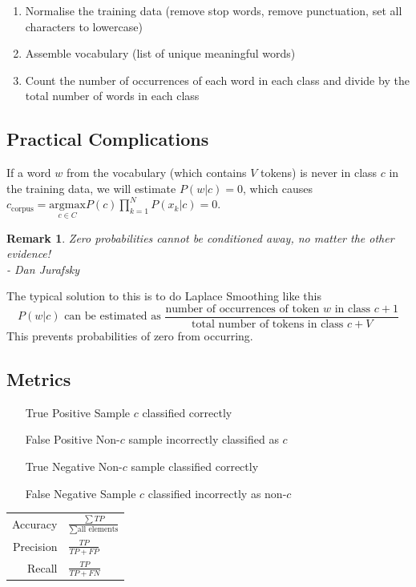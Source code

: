\documentclass[11pt]{article}
\newtheorem*{remark}{Remark}
\begin{document}
\begin{enumerate}
	\item Normalise the training data (remove stop words, remove punctuation, set all characters to lowercase)
	\item Assemble vocabulary (list of unique meaningful words)
	\item Count the number of occurrences of each word in each class and divide by the total number of words in each class
\end{enumerate}

\subsection{Practical Complications}
If a word $w$ from the vocabulary (which contains $V$ tokens) is never in class $c$ in the training data, we will estimate $P(w|c) = 0$, which causes $c_{\text{corpus}}=\underset{c\in C}{\text{argmax}}P(c)\prod_{k=1}^{N}P(x_k|c)=0$.

\begin{remark}
	Zero probabilities cannot be conditioned away, no matter the other evidence!\\ - Dan Jurafsky
\end{remark}

The typical solution to this is to do Laplace Smoothing like this
\begin{equation*}
	P(w|c)\text{ can be estimated as }\frac{\text{number of occurrences of token $w$ in class } c + 1}{\text{total number of tokens in class } c+V}
\end{equation*}
This prevents probabilities of zero from occurring.

\subsection{Metrics}
\begin{itemize}[leftmargin=*, labelindent=3cm, labelsep=1cm]
	\item[True Positive] Sample $c$ classified correctly
	\item[False Positive] Non-$c$ sample incorrectly classified as $c$
	\item[True Negative] Non-$c$ sample classified correctly
	\item[False Negative] Sample $c$ classified incorrectly as non-$c$
\end{itemize}

\begingroup
	\renewcommand{\arraystretch}{1.5}
	\begin{tabularx}{\linewidth}{rX}
		Accuracy & $ \frac{\sum TP}{\sum \text{all elements}} $ \\
		Precision & $\frac{TP}{TP + FP}$\\
		Recall & $ \frac{TP}{TP + FN} $\\
	\end{tabularx}
\endgroup
\end{document}
